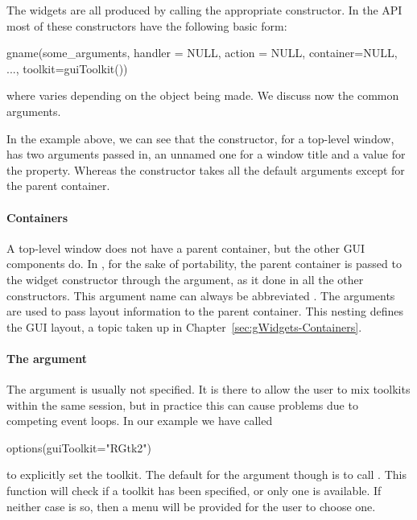 The widgets are all produced by calling the appropriate constructor.
In the  API most of these constructors have the
following basic form:
\begin{Schunk}
\begin{Sinput}
 gname(some_arguments, handler = NULL, action = NULL, 
       container=NULL, ..., toolkit=guiToolkit())
\end{Sinput}
\end{Schunk}
where  varies depending on the object being
made. We discuss now the common arguments.


In the example above, we can see that the  constructor, for a
top-level window, has two arguments passed in, an unnamed one for a
window title and a value for the  property. Whereas the
 constructor takes all the default arguments except for
the parent container.

\paragraph{Containers}

A top-level window does not have a parent container, but the other GUI
components do. In , for the
sake of portability, the parent container is passed to the widget
constructor through the  argument, as it done in all
the other constructors.  This argument name can always be abbreviated
. The  arguments are used to pass layout
information to the parent container. This nesting defines the GUI
layout, a topic taken up in Chapter~\ref{sec:gWidgets-Containers}.

\paragraph{The  argument}
The  argument is usually not specified. It is there to
allow the user to mix toolkits within the same \R\/ session, but in
practice this can cause problems due to competing event loops. 
In our example we have called
\begin{Schunk}
\begin{Sinput}
 options(guiToolkit="RGtk2")
\end{Sinput}
\end{Schunk}
%
to explicitly set the toolkit. The default for the 
argument though is to call . This function
will check if a toolkit has been specified, or only one is
available. If neither case is so, then a menu will be provided for the
user to choose one.

